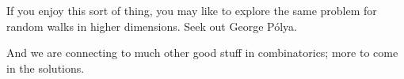 \begin{enumerate}
  If you enjoy this sort of thing, you may like to explore
  the same problem for random walks in higher dimensions.  
  Seek out George P\'{o}lya.

  And we are connecting to much other good stuff in combinatorics; more to 
  come in the solutions.


  
   \solutionstart


   \solutionend
  


  


\end{enumerate}


